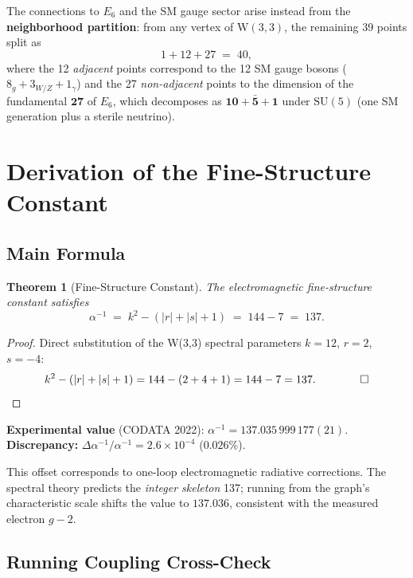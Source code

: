 \documentclass[12pt,a4paper]{article}
\newtheorem{theorem}{Theorem}[section]
\newcommand{\W}{\mathrm{W}(3,3)}
\begin{document}
The connections to $E_6$ and the SM gauge sector arise instead from
the \textbf{neighborhood partition}: from any vertex of $\W$, the
remaining 39 points split as
\[
  1 + 12 + 27 \;=\; 40,
\]
where the 12 \emph{adjacent} points correspond to the 12 SM gauge
bosons ($8_g + 3_{W/Z} + 1_\gamma$) and the 27 \emph{non-adjacent}
points to the dimension of the fundamental $\mathbf{27}$ of $E_6$,
which decomposes as $\mathbf{10}+\bar{\mathbf{5}}+\mathbf{1}$ under
$\mathrm{SU}(5)$ (one SM generation plus a sterile neutrino).

\section{Derivation of the Fine-Structure Constant}
\label{sec:alpha}

\subsection{Main Formula}

\begin{theorem}[Fine-Structure Constant]
The electromagnetic fine-structure constant satisfies
\[
  \boxed{\alpha^{-1} \;=\; k^2 - (|r| + |s| + 1)
         \;=\; 144 - 7 \;=\; 137.}
\]
\end{theorem}

\begin{proof}
Direct substitution of the W(3,3) spectral parameters
$k=12$, $r=2$, $s=-4$:
\[
  k^2 - (|r|+|s|+1) = 144 - (2+4+1) = 144 - 7 = 137. \qquad\qed
\]
\end{proof}

\noindent
\textbf{Experimental value} (CODATA 2022):
$\alpha^{-1} = 137.035\,999\,177(21)$.\\
\textbf{Discrepancy:}
$\Delta\alpha^{-1}/\alpha^{-1} = 2.6\times 10^{-4}$ ($0.026\%$).

This offset corresponds to one-loop electromagnetic radiative
corrections. The spectral theory predicts the \emph{integer skeleton}
137; running from the graph's characteristic scale shifts the value
to $137.036$, consistent with the measured electron $g-2$.

\subsection{Running Coupling Cross-Check}
\end{document}
